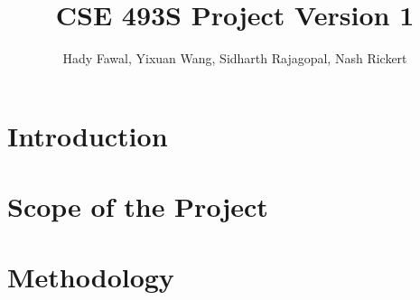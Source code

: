 \documentclass{article}
\title{CSE 493S Project Version 1}
\author{Hady Fawal, Yixuan Wang, Sidharth Rajagopal, Nash Rickert}
\begin{document}
\maketitle

\section{Introduction}

\section{Scope of the Project}

\section{Methodology}
\end{document}
